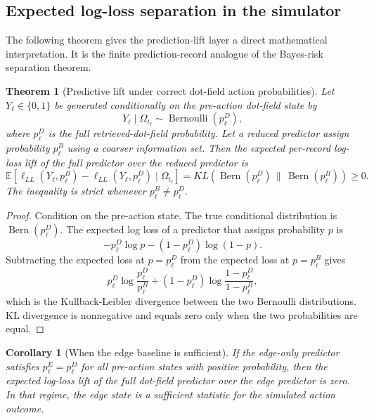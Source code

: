 \documentclass[11pt]{article}
\newtheorem{theorem}{Theorem}
\newtheorem{corollary}{Corollary}
\theoremstyle{remark}
\begin{document}
\subsection{Expected log-loss separation in the simulator}\label{expected-logloss-separation-simulator}

The following theorem gives the prediction-lift layer a direct mathematical
interpretation. It is the finite prediction-record analogue of the Bayes-risk
separation theorem.

\begin{theorem}[Predictive lift under correct dot-field action probabilities]\label{thm:predictive-lift-correct-probabilities}
Let $Y_\ell\in\{0,1\}$ be generated conditionally on the pre-action dot-field
state by
\[
Y_\ell\mid \Omega_{t_\ell}\sim \operatorname{Bernoulli}(p_\ell^D),
\]
where $p_\ell^D$ is the full retrieved-dot-field probability. Let a reduced
predictor assign probability $p_\ell^B$ using a coarser information set. Then
the expected per-record log-loss lift of the full predictor over the reduced
predictor is
\[
\mathbb E\left[\ell_{LL}(Y_\ell,p_\ell^B)-\ell_{LL}(Y_\ell,p_\ell^D)
\mid \Omega_{t_\ell}\right]
=
KL\left(\operatorname{Bern}(p_\ell^D)\,\|\,\operatorname{Bern}(p_\ell^B)\right)
\geq 0.
\]
The inequality is strict whenever $p_\ell^B\neq p_\ell^D$.
\end{theorem}

\begin{proof}
Condition on the pre-action state. The true conditional distribution is
$\operatorname{Bern}(p_\ell^D)$. The expected log loss of a predictor that
assigns probability $p$ is
\[
-p_\ell^D\log p-(1-p_\ell^D)\log(1-p).
\]
Subtracting the expected loss at $p=p_\ell^D$ from the expected loss at
$p=p_\ell^B$ gives
\[
p_\ell^D\log\frac{p_\ell^D}{p_\ell^B}
+(1-p_\ell^D)\log\frac{1-p_\ell^D}{1-p_\ell^B},
\]
which is the Kullback-Leibler divergence between the two Bernoulli
distributions. KL divergence is nonnegative and equals zero only when the two
probabilities are equal.
\end{proof}

\begin{corollary}[When the edge baseline is sufficient]
If the edge-only predictor satisfies $p_\ell^E=p_\ell^D$ for all pre-action
states with positive probability, then the expected log-loss lift of the full
dot-field predictor over the edge predictor is zero. In that regime, the edge
state is a sufficient statistic for the simulated action outcome.
\end{corollary}
\end{document}
